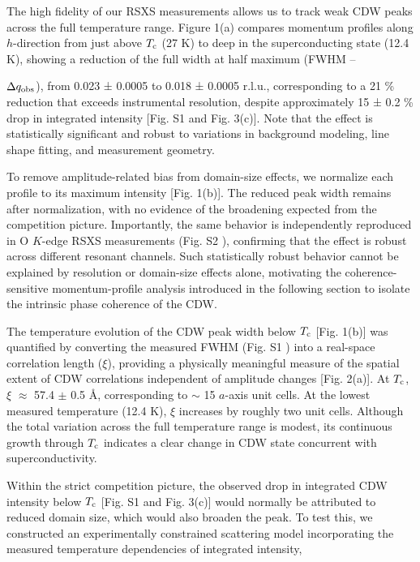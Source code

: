 \documentclass[floatfix,aps,twocolumn,preprintnumbers,superscriptaddress,floatfix,prl]{revtex4-2}
\begin{document}
The high fidelity of our RSXS measurements \cite{Kuo1} allows us to track weak CDW peaks across the full temperature range. Figure 1(a) compares momentum profiles along $h$-direction from just above $T_{\rm c}$ (27 K) to deep in the superconducting state (12.4 K), showing a reduction of the full width at half maximum (FWHM --

$\Delta q_{\rm obs}$), from 0.023 ± 0.0005 to 0.018 ± 0.0005 r.l.u., corresponding to a 21 \% reduction that exceeds instrumental resolution, despite approximately 15 ± 0.2 \% drop in integrated intensity [Fig. S1 \cite{supp} and Fig. 3(c)]. Note that the effect is statistically significant and robust to variations in background modeling, line shape fitting, and measurement geometry.

To remove amplitude-related bias from domain-size effects, we normalize each profile to its maximum intensity [Fig. 1(b)]. The reduced peak width remains after normalization, with no evidence of the broadening expected from the competition picture. Importantly, the same behavior is independently reproduced in O $K$-edge RSXS measurements (Fig. S2 \cite {supp}), confirming that the effect is robust across different resonant channels. Such statistically robust behavior cannot be explained by resolution or domain-size effects alone, motivating the coherence-sensitive momentum-profile analysis introduced in the following section to isolate the intrinsic phase coherence of the CDW.



The temperature evolution of the CDW peak width below $T_{\rm c}$ [Fig. 1(b)] was quantified by converting the measured FWHM (Fig. S1 \cite {supp}) into a real-space correlation length ($\xi$), providing a physically meaningful measure of the spatial extent of CDW correlations independent of amplitude changes [Fig. 2(a)]. At $T_{\rm c}$, $\xi$ $\approx$ 57.4 $\pm$ 0.5 \AA, corresponding to  $\sim$ 15 $a$-axis unit cells. At the lowest measured temperature (12.4 K), $\xi$ increases by roughly two unit cells. Although the total variation across the full temperature range is modest, its continuous growth through $T_{\rm c}$ indicates a clear change in CDW state concurrent with superconductivity.

Within the strict competition picture, the observed drop in integrated CDW intensity below $T_{\rm c}$ [Fig. S1 \cite {supp} and Fig. 3(c)] would normally be attributed to reduced domain size, which would also broaden the peak. To test this, we constructed an experimentally constrained scattering model incorporating the measured temperature dependencies of integrated intensity,
\end{document}
